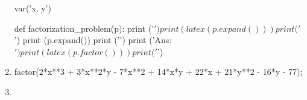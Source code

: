 \begin{enumerate}[resume]

\begin{sympycode}
var('x, y')

def factorization_problem(p):
    print ('$')
    print (latex(p.expand()))
    print ('$ \n')
    print (p.expand())
    print ('\n')
    print ('Ans: $')
    print (latex(p.factor()))
    print ('$\n')

\end{sympycode}

\item {}
\begin{maximacode}
factor(2*x**3 + 3*x**2*y - 7*x**2 + 14*x*y
       + 22*x + 21*y**2 - 16*y - 77);
\end{maximacode}

\item {}

\end{enumerate}
